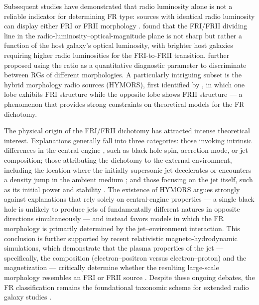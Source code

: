 \documentclass{aa}
\begin{document}
Subsequent studies have demonstrated that radio luminosity alone is not a reliable indicator for determining FR type: sources with identical radio luminosity can display either FRI or FRII morphology \citep[e.g.,][]{mingo_revisiting_2019}. \citet{ledlow_20cm_1996} found that the FRI/FRII dividing line in the radio-luminosity–optical-magnitude plane is not sharp but rather a function of the host galaxy's optical luminosity, with brighter host galaxies requiring higher radio luminosities for the FRI-to-FRII transition. \cite{lin_populations_2010} further proposed using the ratio as a quantitative diagnostic parameter to discriminate between RGs of different morphologies. A particularly intriguing subset is the hybrid morphology radio sources (HYMORS), first identified by \citet{gopal-krishna_extragalactic_2000}, in which one lobe exhibits FRI structure while the opposite lobe shows FRII structure — a phenomenon that provides strong constraints on theoretical models for the FR dichotomy. 

The physical origin of the FRI/FRII dichotomy has attracted intense theoretical interest. Explanations generally fall into three categories: those invoking intrinsic differences in the central engine \citep[e.g.,][]{Baum1995,Meier1999,hardcastle_radio_2020}, such as black hole spin, accretion mode, or jet composition; those attributing the dichotomy to the external environment, including the location where the initially supersonic jet decelerates or encounters a density jump in the ambient medium \citep[e.g.,][]{de_young_relation_1993,bicknell_relativistic_1995,bowman_deceleration_1996,liu_environment_2019}; and those focusing on the jet itself, such as its initial power and stability \citep[e.g.,][]{florido_spatial_1990,Reynolds1996,Meier1997,lane_3c_2002}. The existence of HYMORS argues strongly against explanations that rely solely on central-engine properties — a single black hole is unlikely to produce jets of fundamentally different natures in opposite directions simultaneously \citep{gopal-krishna_extragalactic_2000} — and instead favors models in which the FR morphology is primarily determined by the jet–environment interaction. This conclusion is further supported by recent relativistic magneto-hydrodynamic simulations, which demonstrate that the plasma properties of the jet --- specifically, the composition (electron--positron versus electron--proton) and the magnetization --- critically determine whether the resulting large-scale morphology resembles an FRI or FRII source \citep{tripathi_how_2026}.
Despite these ongoing debates, the FR classification remains the foundational taxonomic scheme for extended radio galaxy studies \citep[e.g.,][]{kapinska_lofar_2017,capetti_friicat_2017a,capetti_friicat_2017b,saikia_radio_2022}.
\end{document}
